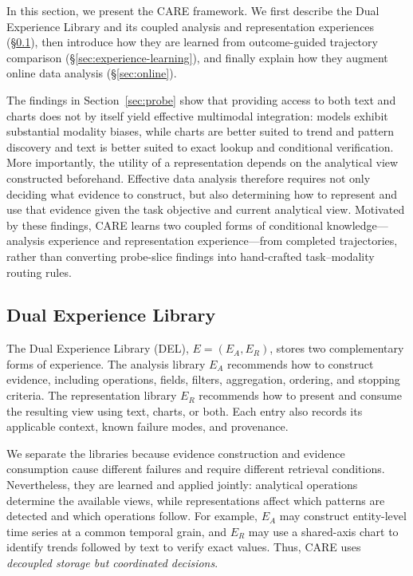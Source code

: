 \documentclass{article}
\newcommand{\method}{\textsc{CARE}}
\begin{document}
In this section, we present the \method{} framework.
We first describe the Dual Experience Library and its coupled analysis and representation experiences (\S\ref{sec:del}), then introduce how they are learned from outcome-guided trajectory comparison (\S\ref{sec:experience-learning}), and finally explain how they augment online data analysis (\S\ref{sec:online}).

The findings in Section~\ref{sec:probe} show that providing access to both text and charts does not by itself yield effective multimodal integration: models exhibit substantial modality biases, while charts are better suited to trend and pattern discovery and text is better suited to exact lookup and conditional verification.
More importantly, the utility of a representation depends on the analytical view constructed beforehand.
Effective data analysis therefore requires not only deciding what evidence to construct, but also determining how to represent and use that evidence given the task objective and current analytical view.
Motivated by these findings, \method{} learns two coupled forms of conditional knowledge---analysis experience and representation experience---from completed trajectories, rather than converting probe-slice findings into hand-crafted task--modality routing rules.


\subsection{Dual Experience Library}
\label{sec:del}

The Dual Experience Library (DEL), $E=(E_A,E_R)$, stores two complementary forms of experience.
The analysis library $E_A$ recommends how to construct evidence, including operations, fields, filters, aggregation, ordering, and stopping criteria.
The representation library $E_R$ recommends how to present and consume the resulting view using text, charts, or both.
Each entry also records its applicable context, known failure modes, and provenance.

We separate the libraries because evidence construction and evidence consumption cause different failures and require different retrieval conditions.
Nevertheless, they are learned and applied jointly: analytical operations determine the available views, while representations affect which patterns are detected and which operations follow.
For example, $E_A$ may construct entity-level time series at a common temporal grain, and $E_R$ may use a shared-axis chart to identify trends followed by text to verify exact values.
Thus, \method{} uses \emph{decoupled storage but coordinated decisions}.
\end{document}
